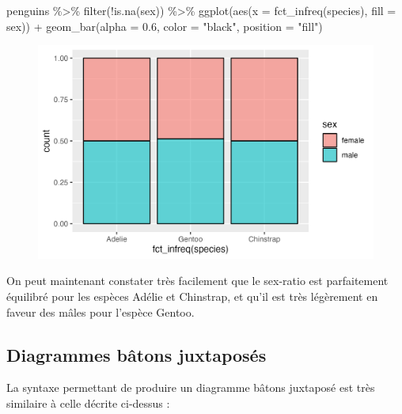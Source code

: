 \documentclass[
  letterpaper,
  DIV=11,
  numbers=noendperiod]{scrreprt}
\newenvironment{Shaded}{\begin{snugshade}}{\end{snugshade}}
\newcommand{\AttributeTok}[1]{\textcolor[rgb]{0.40,0.45,0.13}{#1}}
\newcommand{\FloatTok}[1]{\textcolor[rgb]{0.68,0.00,0.00}{#1}}
\newcommand{\FunctionTok}[1]{\textcolor[rgb]{0.28,0.35,0.67}{#1}}
\newcommand{\NormalTok}[1]{\textcolor[rgb]{0.00,0.23,0.31}{#1}}
\newcommand{\SpecialCharTok}[1]{\textcolor[rgb]{0.37,0.37,0.37}{#1}}
\newcommand{\StringTok}[1]{\textcolor[rgb]{0.13,0.47,0.30}{#1}}
\begin{document}
\begin{Shaded}
\begin{Highlighting}[]
\NormalTok{penguins }\SpecialCharTok{\%\textgreater{}\%} 
  \FunctionTok{filter}\NormalTok{(}\SpecialCharTok{!}\FunctionTok{is.na}\NormalTok{(sex)) }\SpecialCharTok{\%\textgreater{}\%} 
  \FunctionTok{ggplot}\NormalTok{(}\FunctionTok{aes}\NormalTok{(}\AttributeTok{x =} \FunctionTok{fct\_infreq}\NormalTok{(species), }\AttributeTok{fill =}\NormalTok{ sex)) }\SpecialCharTok{+}
  \FunctionTok{geom\_bar}\NormalTok{(}\AttributeTok{alpha =} \FloatTok{0.6}\NormalTok{, }\AttributeTok{color =} \StringTok{"black"}\NormalTok{, }\AttributeTok{position =} \StringTok{"fill"}\NormalTok{)}
\end{Highlighting}
\end{Shaded}

\begin{figure}[H]

{\centering \includegraphics{./03-visualization_files/figure-pdf/unnamed-chunk-57-1.png}

}

\end{figure}

On peut maintenant constater très facilement que le sex-ratio est
parfaitement équilibré pour les espèces Adélie et Chinstrap, et qu'il
est très légèrement en faveur des mâles pour l'espèce Gentoo.

\hypertarget{sec-juxta}{%
\subsection{Diagrammes bâtons juxtaposés}\label{sec-juxta}}

La syntaxe permettant de produire un diagramme bâtons juxtaposé est très
similaire à celle décrite ci-dessus :
\end{document}
